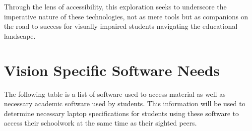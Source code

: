 \documentclass[14pt,letterpaper,twoside]{extreport}
\begin{document}
Through the lens of accessibility, this exploration seeks to underscore the imperative nature of these technologies, not as mere tools but as companions on the road to success for visually impaired students navigating the educational landscape.

\hypertarget{software-needs}{\section{Vision Specific Software Needs}\label{software-needs}}
The following table is a list of software used to access material as well as necessary academic software used by students. This information will be used to determine necessary laptop specifications for students using these software to access their schoolwork at the same time as their sighted peers. 
\end{document}
